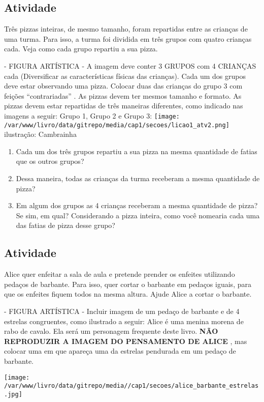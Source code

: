 \documentclass[a4,12pt]{book}
\begin{document}
\subsection{Atividade}
Três pizzas inteiras, de mesmo tamanho, foram repartidas entre as crianças de uma turma. Para isso, a turma foi dividida em três grupos com quatro crianças cada. Veja como cada grupo repartiu a sua pizza.

\begin{imagem*}[breakable]{}{}    - FIGURA ARTÍSTICA - A imagem deve conter 3 GRUPOS com 4 CRIANÇAS cada (Diversificar as características físicas das crianças). Cada um dos grupos deve estar observando uma pizza. Colocar duas das crianças do grupo 3 com feições   ``contrariadas''  . As pizzas devem ter mesmos tamanho e formato. As pizzas devem estar repartidas de três maneiras diferentes, como indicado nas imagens a seguir: Grupo 1, Grupo 2 e Grupo 3:   
    \texttt{[image: /var/www/livro/data/gitrepo/media/cap1/secoes/licao1\_atv2.png]}  
  ilustração: Cambrainha  
\end{imagem*}

\begin{enumerate} [\quad a)] %
  \item     Cada um dos três grupos repartiu a sua pizza na mesma quantidade de fatias que os outros grupos?
  \item     Dessa maneira, todas as crianças da turma receberam a mesma quantidade de pizza?
  \item     Em algum dos grupos as 4 crianças receberam a mesma quantidade de pizza? Se sim, em qual? Considerando a pizza inteira, como você nomearia cada uma das fatias de pizza desse grupo? 
\end{enumerate} %

\subsection{Atividade}

Alice quer enfeitar a sala de aula e pretende prender os enfeites utilizando pedaços de barbante. Para isso, quer cortar o barbante em pedaços iguais, para que os enfeites fiquem todos na mesma altura. Ajude Alice a cortar o barbante.

\begin{imagem*}[breakable]{}{}    - FIGURA ARTÍSTICA - Incluir imagem de um pedaço de barbante e de 4 estrelas congruentes, como ilustrado a seguir:  
  Alice é uma menina morena de rabo de cavalo. Ela será um personagem frequente deste livro.  
  {\bf NÃO REPRODUZIR A IMAGEM DO PENSAMENTO DE ALICE}  , mas colocar uma em que apareça uma da estrelas pendurada em um pedaço de barbante.   
  
    \texttt{[image: /var/www/livro/data/gitrepo/media//cap1/secoes/alice\_barbante\_estrelas.jpg]}  
\end{imagem*}
\end{document}

